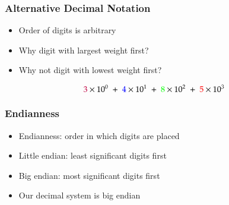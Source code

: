 \begin{frame}
  \frametitle{Alternative Decimal Notation}
  \begin{itemize}
    \item Order of digits is arbitrary
    \item Why digit with largest weight first?
    \item Why not digit with lowest weight first?
  \end{itemize}
  \vskip5mm
  \begin{center}
  \end{center}
  \[
    {\color{purple} 3} \times 10^0 \;+\;
    {\color{blue} 4} \times 10^1 \;+\;
    {\color{green} 8} \times 10^2 \;+\;
    {\color{red} 5} \times 10^3
  \]
\end{frame}

\begin{frame}
  \frametitle{Endianness}
  \begin{itemize}
    \item Endianness: order in which digits are placed
    \item Little endian: least significant digits first
    \item Big endian: most significant digits first
    \item Our decimal system is big endian
  \end{itemize}
\end{frame}

